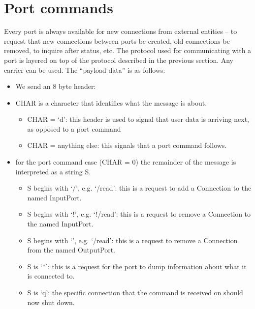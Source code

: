 
\chapter{Port commands}

Every port is always available for new connections from external
entities -- to request that new connections between ports be created,
old connections be removed, to inquire after status, etc.
%
The protocol used for communicating with a port is layered on top of the
protocol described in the previous section.  Any carrier can be used.
The ``payload data'' is as follows:

\begin{itemize}

\item We send an 8 byte header: 

\item CHAR is a character that identifies what the message is about.

  \begin{itemize}
    
  \item CHAR = `d': this header is used to signal that user data is
  arriving next, as opposed to a port command
    
  \item CHAR = anything else: this signals that a port command
    follows.

  \end{itemize}

\item for the port command case (CHAR = 0) the remainder of the message 
  is interpreted as a string S.

  \begin{itemize}
   \item S begins with `/', e.g. `/read': this is a request to add a
   Connection to the named InputPort.

   \item S begins with `!', e.g. `!/read': this is a request to remove
   a Connection to the named InputPort.

   \item S begins with `\twiddle', e.g. `\twiddle/read': this is a
   request to remove a Connection from the named OutputPort.

   \item S is `*': this is a request for the port to dump information
     about what it is connected to.

   \item S is `q': the specific connection that the command is received on
   should now shut down.
  \end{itemize}

\end{itemize}

